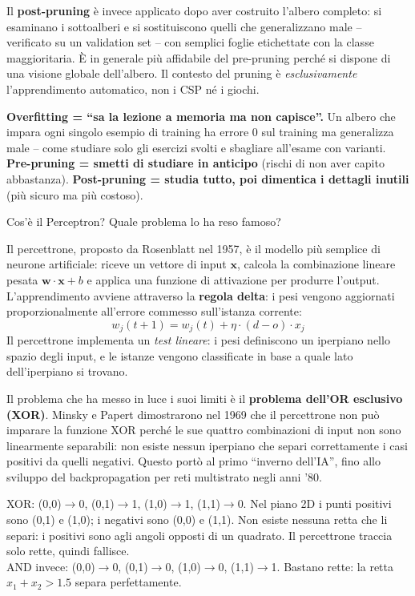 \documentclass[12pt,a4paper]{article}
\begin{document}
Il \textbf{post-pruning} è invece applicato dopo aver costruito l'albero completo: si esaminano i sottoalberi e si sostituiscono quelli che generalizzano male -- verificato su un validation set -- con semplici foglie etichettate con la classe maggioritaria. È in generale più affidabile del pre-pruning perché si dispone di una visione globale dell'albero. Il contesto del pruning è \emph{esclusivamente} l'apprendimento automatico, non i CSP né i giochi.

\begin{ricordabox}
\textbf{Overfitting = ``sa la lezione a memoria ma non capisce''.} Un albero che impara ogni singolo esempio di training ha errore 0 sul training ma generalizza male -- come studiare solo gli esercizi svolti e sbagliare all'esame con varianti.\\[3pt]
\textbf{Pre-pruning = smetti di studiare in anticipo} (rischi di non aver capito abbastanza). \textbf{Post-pruning = studia tutto, poi dimentica i dettagli inutili} (più sicuro ma più costoso).
\end{ricordabox}

\begin{domandabox}{Cos'è il Perceptron? Quale problema lo ha reso famoso?}
\end{domandabox}

Il percettrone, proposto da Rosenblatt nel 1957, è il modello più semplice di neurone artificiale: riceve un vettore di input $\mathbf{x}$, calcola la combinazione lineare pesata $\mathbf{w} \cdot \mathbf{x} + b$ e applica una funzione di attivazione per produrre l'output. L'apprendimento avviene attraverso la \textbf{regola delta}: i pesi vengono aggiornati proporzionalmente all'errore commesso sull'istanza corrente:
\[
w_j(t+1) = w_j(t) + \eta \cdot (d - o) \cdot x_j
\]
Il percettrone implementa un \emph{test lineare}: i pesi definiscono un iperpiano nello spazio degli input, e le istanze vengono classificate in base a quale lato dell'iperpiano si trovano.

Il problema che ha messo in luce i suoi limiti è il \textbf{problema dell'OR esclusivo (XOR)}. Minsky e Papert dimostrarono nel 1969 che il percettrone non può imparare la funzione XOR perché le sue quattro combinazioni di input non sono linearmente separabili: non esiste nessun iperpiano che separi correttamente i casi positivi da quelli negativi. Questo portò al primo ``inverno dell'IA'', fino allo sviluppo del backpropagation per reti multistrato negli anni '80.

\begin{esempiobox}
XOR: (0,0)$\to$0, (0,1)$\to$1, (1,0)$\to$1, (1,1)$\to$0. Nel piano 2D i punti positivi sono (0,1) e (1,0); i negativi sono (0,0) e (1,1). Non esiste nessuna retta che li separi: i positivi sono agli angoli opposti di un quadrato. Il percettrone traccia solo rette, quindi fallisce.\\
AND invece: (0,0)$\to$0, (0,1)$\to$0, (1,0)$\to$0, (1,1)$\to$1. Bastano rette: la retta $x_1 + x_2 > 1.5$ separa perfettamente.
\end{esempiobox}
\end{document}
